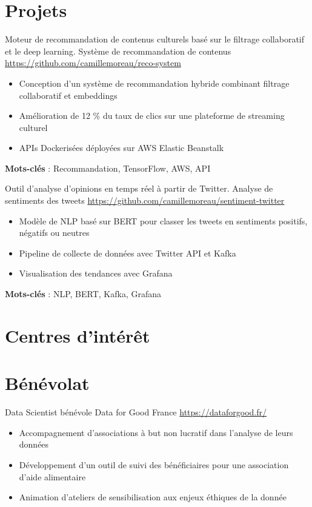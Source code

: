 \documentclass[a4paper, serif, 10pt]{moderncv}
\begin{document}
\section{Projets}

        {Moteur de recommandation de contenus culturels basé sur le filtrage collaboratif et le deep learning.}
        {Système de recommandation de contenus}
        {\url{https://github.com/camillemoreau/reco-system}}
        {}
        {\begin{itemize}
\item Conception d'un système de recommandation hybride combinant filtrage collaboratif et embeddings
\item Amélioration de 12 \% du taux de clics sur une plateforme de streaming culturel
\item APIs Dockerisées déployées sur AWS Elastic Beanstalk
\end{itemize}
\textbf{Mots-clés} : Recommandation, TensorFlow, AWS, API}

        {Outil d'analyse d'opinions en temps réel à partir de Twitter.}
        {Analyse de sentiments des tweets}
        {\url{https://github.com/camillemoreau/sentiment-twitter}}
        {}
        {\begin{itemize}
\item Modèle de NLP basé sur BERT pour classer les tweets en sentiments positifs, négatifs ou neutres
\item Pipeline de collecte de données avec Twitter API et Kafka
\item Visualisation des tendances avec Grafana
\end{itemize}
\textbf{Mots-clés} : NLP, BERT, Kafka, Grafana}
\section{Centres d'intérêt}

\section{Bénévolat}

        {Data Scientist bénévole}
        {Data for Good France}
        {\url{https://dataforgood.fr/}}
        {}
        {\begin{itemize}
\item Accompagnement d'associations à but non lucratif dans l'analyse de leurs données
\item Développement d'un outil de suivi des bénéficiaires pour une association d'aide alimentaire
\item Animation d'ateliers de sensibilisation aux enjeux éthiques de la donnée
\end{itemize}}
\end{document}
